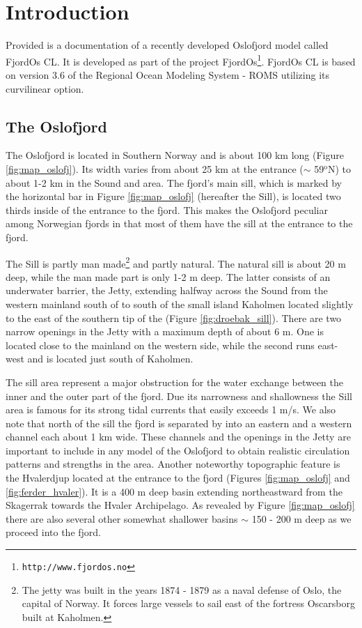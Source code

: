 \section{Introduction}
\label{sec:intro}
Provided is a documentation of a recently developed Oslofjord model called FjordOs CL. It is developed as part of the project FjordOs\footnote{\texttt{http://www.fjordos.no}}. FjordOs CL is based on version 3.6 of the Regional Ocean Modeling System - ROMS \citep{haidv:etal:2008, shche:mcwil:2005, shche:mcwil:2009} utilizing its curvilinear option.

\subsection{The Oslofjord}
\label{subsec:oslofjord}
The Oslofjord is located in Southern Norway and is about 100 km long (Figure \ref{fig:map_oslofj}). Its width varies from about 25 km at the entrance ($\sim$ 59$^\text{o}$N) to about 1-2 km in the {\DR} Sound and {\DR} area. The fjord's main sill, which is marked by the horizontal bar in Figure \ref{fig:map_oslofj} (hereafter the {\DR} Sill), is located two thirds inside of the entrance to the fjord. This makes the Oslofjord peculiar among Norwegian fjords in that most of them have the sill at the entrance to the fjord. 


The {\DR} Sill is partly man made\footnote{The jetty was built in the years 1874 - 1879 as a naval defense of Oslo, the capital of Norway. It forces large vessels to sail east of the fortress Oscarsborg built at Kaholmen.} and partly natural. The natural sill is about 20 m deep, while the man made part is only 1-2 m deep. The latter consists of an underwater barrier, the {\DR} Jetty, extending halfway across the {\DR} Sound from the western mainland south of {\DR} to south of the small island Kaholmen located slightly to the east of the southern tip of the {\HAA} (Figure \ref{fig:droebak_sill}). There are two narrow openings in the Jetty with a maximum depth of about 6 m. One is located close to the mainland on the western side, while the second runs east-west and is located just south of Kaholmen.   
 

The sill area represent a major obstruction for the water exchange between the inner and the outer part of the fjord. Due its narrowness and shallowness the {\DR} Sill area is famous for its strong tidal currents that easily exceeds 1 m/s. We also note that north of the sill the fjord is separated by {\HAA} into an eastern and a western channel each about 1 km wide. These channels and the openings in the Jetty are important to include in any model of the Oslofjord to obtain realistic circulation patterns and strengths in the area. Another noteworthy topographic feature is the Hvalerdjup located at the entrance to the fjord (Figures \ref{fig:map_oslofj} and \ref{fig:ferder_hvaler}). It is a 400 m deep basin extending northeastward from the Skagerrak towards the Hvaler Archipelago. As revealed by Figure \ref{fig:map_oslofj} there are also several other somewhat shallower basins $\sim$ 150 - 200 m deep as we proceed into the fjord. 
 

